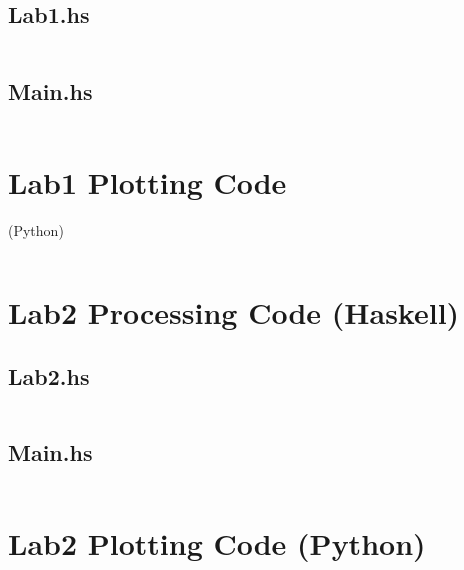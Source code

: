 \documentclass[a4paper]{article}
\begin{document}
\subsection{Lab1.hs}
\inputminted{haskell}{../src/AI/Lab1/Lab1.hs}

\subsection{Main.hs}
\inputminted{haskell}{../src/AI/Lab1/Main.hs}

\section{Lab1 Plotting Code} (Python)
\inputminted{python}{../src/AI/Lab1/plotting.py}


\section{Lab2 Processing Code (Haskell)}

\subsection{Lab2.hs}
\inputminted{haskell}{../src/AI/Lab2/Lab2.hs}

\subsection{Main.hs}
\inputminted{haskell}{../src/AI/Lab2/Main.hs}


\section{Lab2 Plotting Code (Python)}
\inputminted{python}{../src/AI/Lab2/plotting.py}
\end{document}
